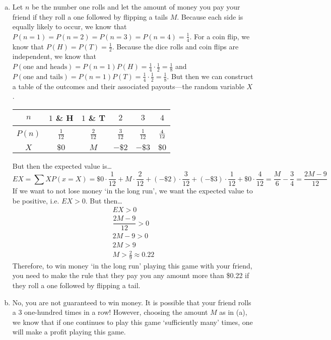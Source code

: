 \documentclass[11pt,letterpaper]{article}
\begin{document}
\sol 
\begin{enumerate}[(a)]
\item Let $n$ be the number one rolls and let the amount of money you pay your friend if they roll a one followed by flipping a tails $M$. Because each side is equally likely to occur, we know that $P(n= 1)= P(n= 2)= P(n= 3)= P(n= 4)= \frac{1}{4}$. For a coin flip, we know that $P(H)= P(T)= \frac{1}{2}$. Because the dice rolls and coin flips are independent, we know that $P(\text{one and heads})= P(n= 1) P(H)= \frac{1}{4} \cdot \frac{1}{2}= \frac{1}{8}$ and $P(\text{one and tails})= P(n= 1) P(T)= \frac{1}{4} \cdot \frac{1}{2}= \frac{1}{8}$. But then we can construct a table of the outcomes and their associated payouts---the random variable $X$. \par
	\begin{table}[!ht]
	\centering 
	\begin{tabular}{|c||c|c|c|c|c|} \hline 
	$n$ & $1$ \& H & $1$ \& T & $2$ & $3$ & $4$ \\ \hline 
	$P(n)$ & $\frac{1}{12}$ & $\frac{2}{12}$ & $\frac{3}{12}$ & $\frac{1}{12}$ & $\frac{4\rule{0pt}{2.0ex}}{12\rule[-0.8ex]{0pt}{0pt}}$ \\ \hline
	$X$ & $\$0$ & $M$ & $-\$2$ & $-\$3$ & $\$0$ \\ \hline
	\end{tabular}
	\end{table} \par
But then the expected value is\dots
	\[
	EX= \sum X P(x= X)= \$0 \cdot \dfrac{1}{12} + M \cdot \dfrac{2}{12} + (-\$2) \cdot \dfrac{3}{12} + (-\$3) \cdot \dfrac{1}{12} + \$0 \cdot \dfrac{4}{12}= \dfrac{M}{6} -\dfrac{3}{4}= \dfrac{2M - 9}{12}
	\]
If we want to not lose money `in the long run', we want the expected value to be positive, i.e. $EX > 0$. But then\dots
	\[
	\begin{gathered}
	EX > 0 \\
	\dfrac{2M - 9}{12} > 0 \\
	2M - 9 > 0 \\
	2M > 9 \\
	M > \frac{2}{9} \approx 0.22
	\end{gathered}
	\]
Therefore, to win money `in the long run' playing this game with your friend, you need to make the rule that they pay you any amount more than \$0.22 if they roll a one followed by flipping a tail. \pspace

\item No, you are not guaranteed to win money. It is possible that your friend rolls a 3 one-hundred times in a row! However, choosing the amount $M$ as in (a), we know that if one continues to play this game `sufficiently many' times, one will make a profit playing this game. 
\end{enumerate}
\end{document}
